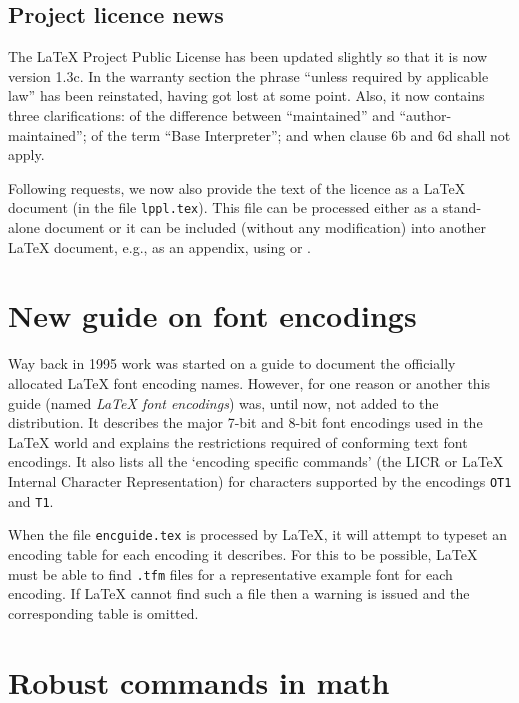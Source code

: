 \documentclass{ltnews}
\providecommand\file[1]{\texttt{#1}}
\begin{document}
\maketitle


\subsection{Project licence news}

The \LaTeX{} Project Public License has been updated slightly so that
it is now version 1.3c.  In the warranty section the
phrase ``unless required by applicable law'' has been reinstated,
having got lost at some point.  Also,
it now contains three clarifications: of the difference between
``maintained'' and ``author-maintained''; of the
term ``Base Interpreter''; and when clause 6b and 6d shall not apply.

Following requests, we now also provide the text of the licence as a
\LaTeX{} document (in the file \texttt{lppl.tex}). This file can be
processed either as a stand-alone document or it can be included
(without any modification) into another \LaTeX{} document, e.g., as an
appendix, using \verb|| or \verb||.


\section{New guide on font encodings}

Way back in 1995 work was started on a guide to document the
officially allocated \LaTeX{} font encoding names. However, for one
reason or another this guide (named \textit{\LaTeX{} font encodings})
was, until now, not added to the distribution.  It describes the major
7-bit and 8-bit font encodings used in the \LaTeX{} world and explains
the restrictions required of conforming text font encodings.  It also
lists all the `encoding specific commands' (the LICR or \LaTeX{}
Internal Character Representation) for characters supported by the
encodings \texttt{OT1} and \texttt{T1}.

When the file \file{encguide.tex} is processed by \LaTeX{}, it will
attempt to typeset an encoding table for each encoding it describes.
For this to be possible, \LaTeX{} must be able to find \texttt{.tfm}
files for a representative example font for each encoding.  If
\LaTeX{} cannot find such a file then a warning is issued and the
corresponding table is omitted.


\section{Robust commands in math}
\end{document}
